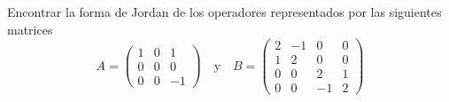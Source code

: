 \item Encontrar la forma de Jordan de los operadores representados por las siguientes matrices\[A=\begin{pmatrix}
        1&0&1\\0&0&0\\0&0&-1
    \end{pmatrix}\quad\text{y}\quad B=\begin{pmatrix}
        2&-1&0&0\\1&2&0&0\\0&0&2&1\\0&0&-1&2
    \end{pmatrix}\]
    \begin{mdframed}[style=s]
        
    \end{mdframed}